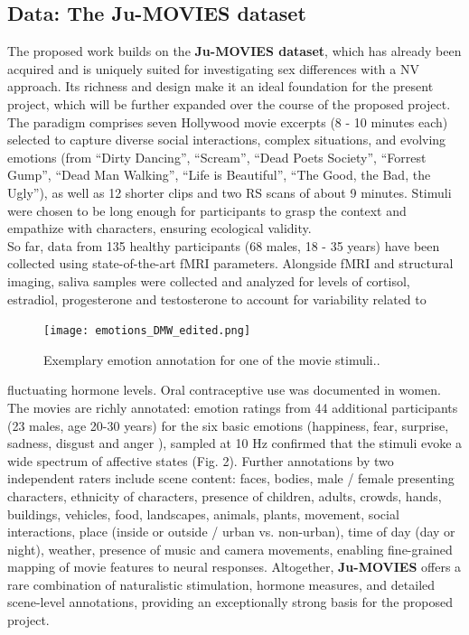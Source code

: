 \documentclass[11pt,a4paper]{article}
\begin{document}
\subsection*{Data: The Ju-MOVIES dataset}
The proposed work builds on the \textbf{Ju-MOVIES dataset}, which has already been acquired and is 
uniquely suited for investigating sex differences with a NV approach. Its richness and design make it an ideal 
foundation for the present project, which will be further expanded over the course of the proposed project. 
The paradigm comprises seven Hollywood movie excerpts (8 - 10 minutes each) selected to capture diverse social 
interactions, complex situations, and evolving emotions (from “Dirty Dancing”, “Scream”, “Dead Poets Society”, “Forrest Gump”, 
“Dead Man Walking”, “Life is Beautiful”, “The Good, the Bad, the Ugly”), as well as 12 shorter clips and two 
RS scans of about 9 minutes.
Stimuli were chosen to be long enough for participants to grasp the context and empathize with characters, 
ensuring ecological validity.\\
So far, data from 135 healthy participants (68 males, 18 - 35 years) have been collected using state-of-the-art fMRI parameters. 
Alongside fMRI and structural imaging, saliva samples were collected and analyzed for levels of cortisol, estradiol, progesterone 
and testosterone to account for variability related to
\begin{figure} %
  \vspace{-10pt} %
  \texttt{[image: emotions\_DMW\_edited.png]}
  \caption{Exemplary emotion annotation for one of the movie stimuli..}
  \label{fig:dmw}
\end{figure}
fluctuating hormone levels. 
Oral contraceptive use was documented in women.\\
The movies are richly annotated: 
emotion ratings from 44 additional participants (23 males, age 20-30 years)
for the six basic emotions (happiness, fear, surprise, sadness, disgust and anger \parencite{ekmanConstantsCulturesFace1971a}), 
sampled at 10 Hz confirmed that the stimuli evoke a wide spectrum of affective states (Fig. 2). 
Further annotations by two independent raters include scene content: faces, bodies, male / female presenting characters, ethnicity of characters, presence of children, 
adults, crowds, hands, buildings, vehicles, food, landscapes, animals, plants, movement, social interactions, 
place (inside or outside / urban vs. non-urban), time of day (day or night), weather, presence of music and 
camera movements, enabling fine-grained mapping of movie features to neural responses.
Altogether, \textbf{Ju-MOVIES} offers a rare combination of naturalistic stimulation, hormone measures, 
and detailed scene-level annotations, providing an exceptionally strong basis for the proposed project.
\end{document}
